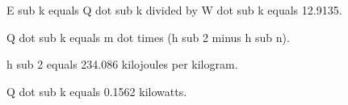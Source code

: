 E sub k equals Q dot sub k divided by W dot sub k equals 12.9135.

Q dot sub k equals m dot times (h sub 2 minus h sub n).

h sub 2 equals 234.086 kilojoules per kilogram.

Q dot sub k equals 0.1562 kilowatts.